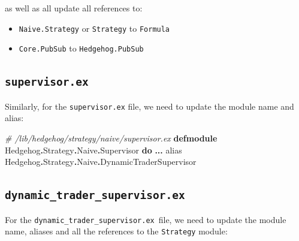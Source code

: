 \documentclass[
  oneside]{book}
\newenvironment{Shaded}{\begin{snugshade}}{\end{snugshade}}
\newcommand{\CommentTok}[1]{\textcolor[rgb]{0.56,0.35,0.01}{\textit{#1}}}
\newcommand{\ConstantTok}[1]{\textcolor[rgb]{0.56,0.35,0.01}{#1}}
\newcommand{\ImportTok}[1]{#1}
\newcommand{\KeywordTok}[1]{\textcolor[rgb]{0.13,0.29,0.53}{\textbf{#1}}}
\newcommand{\OperatorTok}[1]{\textcolor[rgb]{0.81,0.36,0.00}{\textbf{#1}}}
\providecommand{\tightlist}{%
  \setlength{\itemsep}{0pt}\setlength{\parskip}{0pt}}
\begin{document}
as well as all update all references to:

\begin{itemize}
\tightlist
\item
  \texttt{Naive.Strategy} or \texttt{Strategy} to \texttt{Formula}
\item
  \texttt{Core.PubSub} to \texttt{Hedgehog.PubSub}
\end{itemize}

\subsection{\texorpdfstring{\texttt{supervisor.ex}}{supervisor.ex}}\label{supervisor.ex}

Similarly, for the \texttt{supervisor.ex} file, we need to update the module name and alias:

\begin{Shaded}
\begin{Highlighting}[]
\CommentTok{\# /lib/hedgehog/strategy/naive/supervisor.ex}
\KeywordTok{defmodule} \ConstantTok{Hedgehog}\OperatorTok{.}\ConstantTok{Strategy}\OperatorTok{.}\ConstantTok{Naive}\OperatorTok{.}\ConstantTok{Supervisor} \KeywordTok{do}
  \OperatorTok{...}
  \ImportTok{alias} \ConstantTok{Hedgehog}\OperatorTok{.}\ConstantTok{Strategy}\OperatorTok{.}\ConstantTok{Naive}\OperatorTok{.}\ConstantTok{DynamicTraderSupervisor}
\end{Highlighting}
\end{Shaded}

\subsection{\texorpdfstring{\texttt{dynamic\_trader\_supervisor.ex}}{dynamic\_trader\_supervisor.ex}}\label{dynamic_trader_supervisor.ex}

For the \texttt{dynamic\_trader\_supervisor.ex}~file, we need to update the module name, aliases and all the references to the \texttt{Strategy} module:
\end{document}
